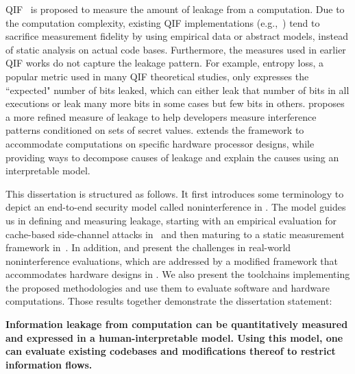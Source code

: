 \Gls{QIF}~\cite{denning1982cryptography,Gray:2991:TMF} is
proposed to measure the amount of leakage from a computation.
Due to the computation complexity, existing \gls{QIF}
implementations (e.g.,~\cite{sidebuster:ccs10,chapman2011automated,Phan:2014:AMC:2590296.2590328,QIFverilog})
tend to sacrifice measurement fidelity by using empirical data or
abstract models, instead of static analysis on actual code bases.
Furthermore, the measures used in earlier \gls{QIF} works do not
capture the leakage pattern.  For example,
entropy loss, a popular metric used in many \gls{QIF} theoretical
studies, only expresses the ``expected" number of bits leaked, which
can either leak that number of bits in all executions or leak many
more bits in some cases but few bits in others.  
proposes a more refined measure of leakage to help developers
measure interference patterns conditioned on sets of secret values.
 extends the framework to accommodate
computations on specific hardware processor designs, while providing
ways to decompose causes of leakage and explain the causes using an
interpretable model.

This dissertation is structured as follows. It first introduces some
terminology to depict an end-to-end security model called
noninterference in . The model guides us in defining
and measuring leakage, starting with an empirical evaluation for
cache-based side-channel attacks in~ and then
maturing to a static measurement framework in~. In
addition,  and 
present the challenges in real-world noninterference evaluations,
which are addressed by a modified framework that accommodates hardware
designs in . We also present the toolchains
implementing the proposed methodologies and use them to evaluate
software and hardware computations. Those results together demonstrate
the dissertation statement:

\textbf{Information leakage from computation can be quantitatively
  measured and expressed in a human-interpretable model. Using this
  model, one can evaluate existing codebases and
  modifications thereof to restrict information flows.}

